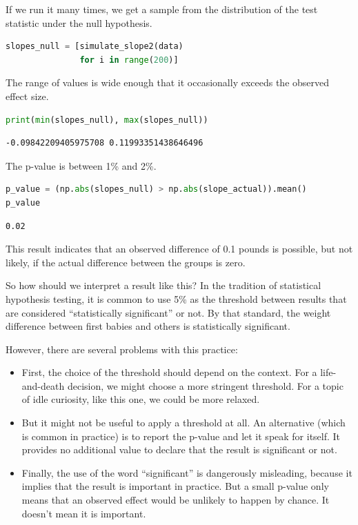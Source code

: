 If we run it many times, we get a sample from the distribution of the
test statistic under the null hypothesis.

\begin{lstlisting}[language=Python,style=source]
slopes_null = [simulate_slope2(data)
               for i in range(200)]
\end{lstlisting}

The range of values is wide enough that it occasionally exceeds the
observed effect size.

\begin{lstlisting}[language=Python,style=source]
print(min(slopes_null), max(slopes_null))
\end{lstlisting}

\begin{lstlisting}[style=output]
-0.09842209405975708 0.11993351438646496
\end{lstlisting}

The p-value is between 1\% and 2\%.

\begin{lstlisting}[language=Python,style=source]
p_value = (np.abs(slopes_null) > np.abs(slope_actual)).mean()
p_value
\end{lstlisting}

\begin{lstlisting}[style=output]
0.02
\end{lstlisting}

This result indicates that an observed difference of 0.1 pounds is
possible, but not likely, if the actual difference between the groups is
zero.

So how should we interpret a result like this? In the tradition of
statistical hypothesis testing, it is common to use 5\% as the threshold
between results that are considered ``statistically significant'' or
not. By that standard, the weight difference between first babies and
others is statistically significant.

However, there are several problems with this practice:

\begin{itemize}
\item
  First, the choice of the threshold should depend on the context. For a
  life-and-death decision, we might choose a more stringent threshold.
  For a topic of idle curiosity, like this one, we could be more
  relaxed.
\item
  But it might not be useful to apply a threshold at all. An alternative
  (which is common in practice) is to report the p-value and let it
  speak for itself. It provides no additional value to declare that the
  result is significant or not.
\item
  Finally, the use of the word ``significant'' is dangerously
  misleading, because it implies that the result is important in
  practice. But a small p-value only means that an observed effect would
  be unlikely to happen by chance. It doesn't mean it is important.
\end{itemize}

